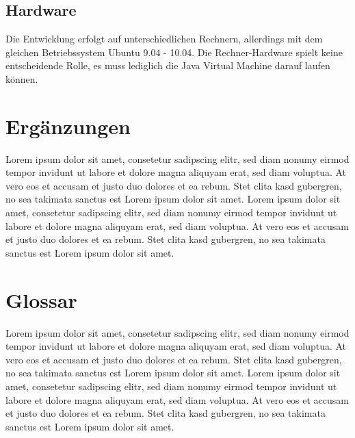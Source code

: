 \documentclass[12pt,oneside,a4paper,bibtotoc,liststotoc,pointlessnumbers]{scrartcl}
\begin{document}
\subsection{Hardware}
Die Entwicklung erfolgt auf unterschiedlichen Rechnern, allerdings mit dem gleichen Betriebssystem Ubuntu 9.04 - 10.04.
Die Rechner-Hardware spielt keine entscheidende Rolle, es muss lediglich die Java Virtual Machine darauf laufen können. 

\newpage
\section{Ergänzungen}
Lorem ipsum dolor sit amet, consetetur sadipscing elitr, sed diam nonumy eirmod tempor invidunt ut labore et dolore magna aliquyam erat, sed diam voluptua. At vero eos et accusam et justo duo dolores et ea rebum. Stet clita kasd gubergren, no sea takimata sanctus est Lorem ipsum dolor sit amet. Lorem ipsum dolor sit amet, consetetur sadipscing elitr, sed diam nonumy eirmod tempor invidunt ut labore et dolore magna aliquyam erat, sed diam voluptua. At vero eos et accusam et justo duo dolores et ea rebum. Stet clita kasd gubergren, no sea takimata sanctus est Lorem ipsum dolor sit amet.
\newpage
\section{Glossar}
Lorem ipsum dolor sit amet, consetetur sadipscing elitr, sed diam nonumy eirmod tempor invidunt ut labore et dolore magna aliquyam erat, sed diam voluptua. At vero eos et accusam et justo duo dolores et ea rebum. Stet clita kasd gubergren, no sea takimata sanctus est Lorem ipsum dolor sit amet. Lorem ipsum dolor sit amet, consetetur sadipscing elitr, sed diam nonumy eirmod tempor invidunt ut labore et dolore magna aliquyam erat, sed diam voluptua. At vero eos et accusam et justo duo dolores et ea rebum. Stet clita kasd gubergren, no sea takimata sanctus est Lorem ipsum dolor sit amet.

\newpage

\listoffigures

\newpage

\listoftables


\end{document}
